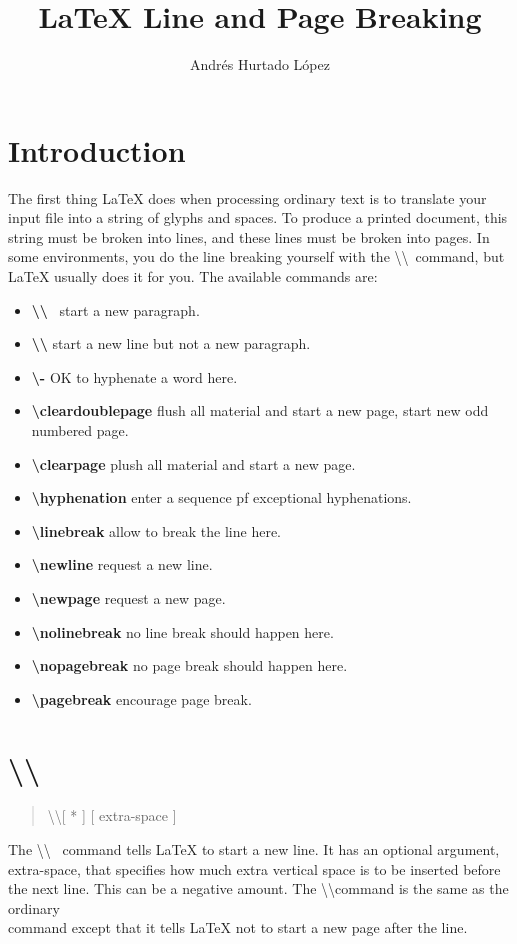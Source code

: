\documentclass[letterpaper,twocolumn]{article}
\title{LaTeX Line and Page Breaking}
\date{}
\author{Andrés Hurtado López}
\begin{document}
\maketitle
\section{Introduction}
The first thing LaTeX does when processing ordinary text is to translate your input file into a string of glyphs and spaces. To produce a printed document, this string must be broken into lines, and these lines must be broken into pages. In some environments, you do the line breaking yourself with the \textbackslash\textbackslash~command, but LaTeX usually does it for you. The available commands are:
\begin{itemize}
\item \textbf{\textbackslash  \textbackslash}~ start a new paragraph.
\item \textbf{\textbackslash \textbackslash *} start a new line but not a new paragraph.
\item \textbf{\textbackslash -} OK to hyphenate a word here.
\item \textbf{\textbackslash cleardoublepage} flush all material and start a new page, start new odd numbered page.
\item \textbf{\textbackslash clearpage} plush all material and start a new page.
\item \textbf{\textbackslash  hyphenation} enter a sequence pf exceptional hyphenations.
\item \textbf{\textbackslash linebreak} allow to break the line here.
\item \textbf{\textbackslash newline} request a new line.
\item \textbf{\textbackslash newpage} request a new page.
\item \textbf{\textbackslash nolinebreak} no line break should happen here.
\item \textbf{\textbackslash nopagebreak} no page break should happen here.
\item \textbf{\textbackslash pagebreak} encourage page break.
\end{itemize}
\section{\textbackslash \textbackslash}
\begin{quote}
\textbackslash \textbackslash [ * ] [ extra-space ]
\end{quote}
The \textbackslash \textbackslash~ command tells LaTeX to start a new line. It has an optional argument, extra-space, that specifies how much extra vertical space is to be inserted before the next line. This can be a negative amount.
The \textbackslash \textbackslash * command is the same as the ordinary \\ command except that it tells LaTeX not to start a new page after the line.
\end{document}

